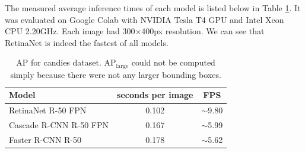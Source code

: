 The measured average inference times of each model is listed below in Table
\ref{tab:candies_time}. It was evaluated on Google Colab with NVIDIA Tesla T4
GPU and Intel Xeon CPU 2.20GHz. Each image had 300$\times$400px resolution. We
can see that RetinaNet is indeed the fastest of all models.

\begin{table}[H]
	\centering
	\begin{tabular}{l|c|c}
		Model                  & seconds per image & FPS                               \\
		\hline
		RetinaNet R-50 FPN     & 0.102             & \scriptsize $\sim$\normalsize9.80 \\
		Cascade R-CNN R-50 FPN & 0.167             & \scriptsize $\sim$\normalsize5.99 \\
		Faster R-CNN R-50      & 0.178             & \scriptsize $\sim$\normalsize5.62 \\
	\end{tabular}
	\caption{AP for candies dataset. AP$_\text{large}$ could not be computed
		simply because there were not any larger bounding boxes.}
	\label{tab:candies_time}
\end{table}

